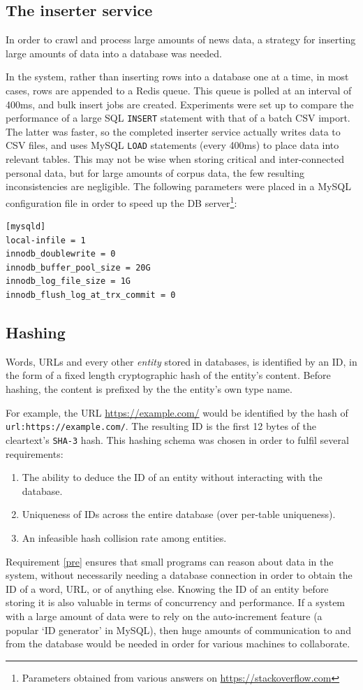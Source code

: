 \subsection{The inserter service}
In order to crawl and process large amounts of news data, a strategy
for inserting large amounts of data into a database was needed.

In the \nr{} system, rather than inserting rows into a database one
at a time,
in most cases, rows are appended to a Redis queue.  This queue is
polled at an interval of 400ms, and bulk insert jobs are
created. Experiments were set up to compare the performance
of a large SQL {\tt INSERT} statement with that of a batch CSV
import.  The latter was faster, so the completed inserter service
actually writes data to CSV files, and uses MySQL
{\tt LOAD} statements (every 400ms) to place data into relevant
tables.  This may not be wise when storing critical and inter-connected
personal data, but for large amounts of corpus data, the
few resulting inconsistencies are negligible.
The following parameters were placed in a MySQL configuration
file in order to speed up the DB server\footnote{Parameters obtained
from various answers on \url{https://stackoverflow.com}}:
\begin{verbatim}
[mysqld]
local-infile = 1 
innodb_doublewrite = 0
innodb_buffer_pool_size = 20G
innodb_log_file_size = 1G
innodb_flush_log_at_trx_commit = 0
\end{verbatim}
\subsection{Hashing\label{hashing}}
Words, URLs and every other {\it entity} stored
in \nr{} databases, is identified by an ID, in the
form of a fixed length cryptographic hash of the entity's
content.  Before hashing, the content is prefixed by the the
entity's own type name.

For example, the URL \url{https://example.com/} would be
identified by the hash of {\tt url:https://example.com/}.
The resulting ID is the first 12 bytes of the cleartext's
{\tt SHA-3} hash.  This hashing schema was chosen in order
to fulfil several requirements:
\begin{enumerate}
    \item The ability to deduce the ID of an entity without
          interacting with the database.\label{pre}
    \item Uniqueness of IDs across the entire
          database (over per-table uniqueness).\label{uniq}
    \item An infeasible hash collision rate among entities.\label{low}
\end{enumerate}
Requirement \ref{pre} ensures that small programs 
can reason about data in the \nr{} system,
without necessarily needing a database connection in order to
obtain the ID of a word, URL, or of anything else.
Knowing the ID of an entity before storing it is also
valuable in terms of concurrency and performance.  If a system
with a large amount of data were to rely on the auto-increment
feature (a popular `ID generator' in MySQL), then
huge amounts of communication to and from the database
would be needed in order for various machines to collaborate.

